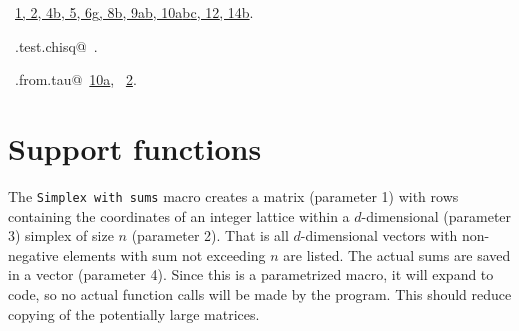 \documentclass[reqno]{amsart}
\renewcommand{\NWlink}[2]{\hyperlink{#1}{#2}}
\begin{document}
\begin{flushleft}
\begin{list}{}{\setlength{\itemsep}{-\parsep}\setlength{\itemindent}{-\leftmargin}}
\item \NWtxtFileDefBy\ \NWlink{nuweb1}{1}\NWlink{nuweb2}{, 2}\NWlink{nuweb4b}{, 4b}\NWlink{nuweb5}{, 5}\NWlink{nuweb6g}{, 6g}\NWlink{nuweb8b}{, 8b}\NWlink{nuweb9a}{, 9a}\NWlink{nuweb9b}{b}\NWlink{nuweb10a}{, 10a}\NWlink{nuweb10b}{b}\NWlink{nuweb10c}{c}\NWlink{nuweb12}{, 12}\NWlink{nuweb14b}{, 14b}.
\item \NWtxtIdentsDefed\nobreak\  \verb@mc.test.chisq@\nobreak\ \NWtxtIdentsNotUsed.\item \NWtxtIdentsUsed\nobreak\  \verb@corr.from.tau@\nobreak\ \NWlink{nuweb10a}{10a}, \verb@tau@\nobreak\ \NWlink{nuweb2}{2}.
\item{}
\end{list}
\vspace{4ex}
\end{flushleft}
\section{Support functions}

The \texttt{Simplex with sums} macro creates a matrix (parameter 1) with rows containing the coordinates of an
integer lattice within a $d$-dimensional (parameter 3) simplex of size $n$ (parameter 2). That is all $d$-dimensional
vectors with non-negative elements with sum not exceeding $n$ are listed. The actual sums are saved in a vector (parameter 4).
Since this is a parametrized macro, it will expand to code, so no actual function calls will be made by the program.
This should reduce copying of the potentially large matrices.
\end{document}
